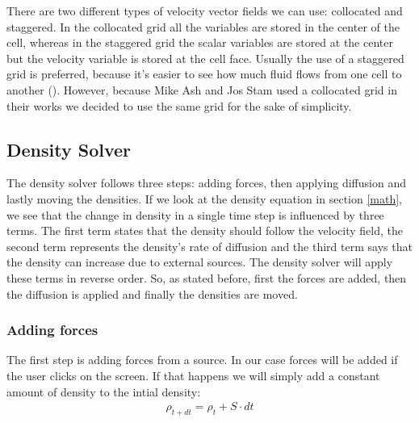 \documentclass[a4paper,12pt,titlepage]{article}
\begin{document}
There are two different types of velocity vector fields we can use: collocated and staggered.
In the collocated grid all the variables are stored in the center of the cell,
whereas in the staggered grid the scalar variables are stored at the center but the velocity variable is stored at the cell face. 
Usually the use of a staggered grid is preferred, because it's easier to see how much fluid flows from one cell to another (\cite{tenminute}).
However, because Mike Ash and Jos Stam used a collocated grid in their works we decided to use the same grid for the sake of simplicity.

\subsection{Density Solver} \label{density}
The density solver follows three steps:
adding forces, then applying diffusion and lastly moving the densities. 
If we look at the density equation in section \ref{math}, we see that the change in density in a single time step is influenced by three terms. 
The first term states that the density should follow the velocity field,
the second term represents the density's rate of diffusion
and the third term says that the density can increase due to external sources. 
The density solver will apply these terms in reverse order. 
So, as stated before, first the forces are added, then the diffusion is applied and finally the densities are moved.

\subsubsection{Adding forces}
The first step is adding forces from a source. In our case forces will be added if the user clicks on the screen.
If that happens we will simply add a constant amount of density to the intial density:
\[
\begin{array}{ll}
  \rho_{t+dt} = \rho_t + S \cdot dt
\end{array}
\]
\end{document}
